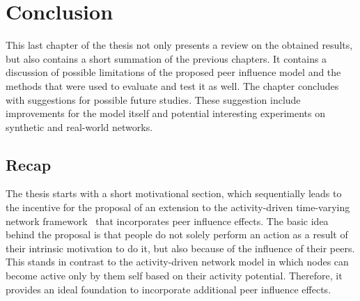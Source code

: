 





\chapter{Conclusion}
\label{cha:conclusion}

This last chapter of the thesis not only presents a review on the obtained results, but also contains a short summation of the previous chapters.
It contains a discussion of possible limitations of the proposed peer influence model and the methods that were used to evaluate and test it as well.
The chapter concludes with suggestions for possible future studies.
These suggestion include improvements for the model itself and potential interesting experiments on synthetic and real-world networks.




\section{Recap}
\label{sec:recap}

The thesis starts with a short motivational section, which sequentially leads to the incentive for the proposal of an extension to the activity-driven time-varying network framework~\cite{Perra2012a} that incorporates peer influence effects.
The basic idea behind the proposal is that people do not solely perform an action as a result of their intrinsic motivation to do it, but also because of the influence of their peers.
This stands in contrast to the activity-driven network model in which nodes can become active only by them self based on their activity potential.
Therefore, it provides an ideal foundation to incorporate additional peer influence effects.

